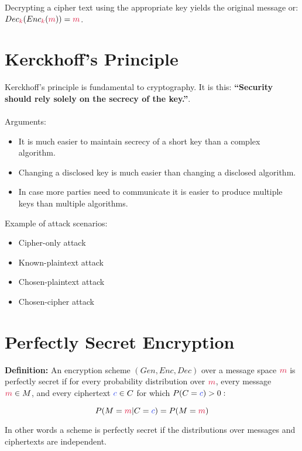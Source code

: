     Decrypting a cipher text using the appropriate key yields the original message or: $Dec_\ck(Enc_\ck(\cm))=\cm$.
    \\
    
\section{Kerckhoff's Principle}
    Kerckhoff's principle is fundamental to cryptography. It is this: \textbf{``Security should rely solely on the secrecy of the key.''}.\\
    \\
    Arguments:
    \begin{itemize}
      \item It is much easier to maintain secrecy of a short key than a complex algorithm.
      \item Changing a disclosed key is much easier than changing a disclosed algorithm.
      \item In case more parties need to communicate it is easier to produce multiple keys than multiple algorithms.
    \end{itemize}
    Example of attack scenarios:
    \begin{itemize}
      \item Cipher-only attack
      \item Known-plaintext attack
      \item Chosen-plaintext attack
      \item Chosen-cipher attack
    \end{itemize}

\section{Perfectly Secret Encryption}
  \textbf{Definition:} An encryption scheme $(Gen,Enc,Dec)$ over a message space $\cm$ is perfectly secret if for every probability distribution over $\cm$, every message $\cm \in M$, and every ciphertext $\cc \in C$ for which $P(C=\cc)>0:$

  $$P(M=\cm|C=\cc)=P(M=\cm)$$

  In other words a scheme is perfectly secret if the distributions over messages and ciphertexts are independent.

